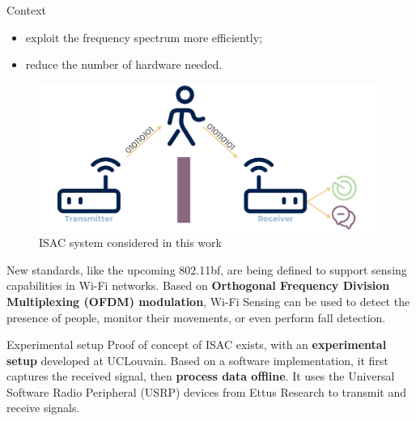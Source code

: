 \documentclass[final]{beamer}
\newlength{\onecolwid}
\begin{document}
\begin{frame}[t,fragile]
\begin{columns}[t]
\begin{column}{\onecolwid}
\begin{block}{Context}
    \begin{itemize}
      \item \hspace{0.2cm} exploit the frequency spectrum more efficiently;
      \item \hspace{0.2cm} reduce the number of hardware needed.
    \end{itemize}

    \begin{figure}[!ht]
      \centering
      \includegraphics[width=\linewidth]{img/isac.pdf}
      \caption{ISAC system considered in this work}
    \end{figure}

    \vspace{-0.2in}


    New standards, like the upcoming 802.11bf, are being defined to support sensing capabilities in Wi-Fi networks. 
    Based on \textbf{Orthogonal Frequency Division Multiplexing (OFDM) modulation}, Wi-Fi Sensing can be used to detect the presence of people, monitor their movements, or even perform fall detection.
  \end{block}

  \vspace{-0.2in}

  \begin{block}{Experimental setup}
    Proof of concept of ISAC exists, with an \textbf{experimental setup} developed at UCLouvain. 
    Based on a software implementation,  %
    it first captures the received signal, then \textbf{process data offline}. 
    It uses the Universal Software Radio Peripheral (USRP) devices from Ettus Research to transmit and receive signals.


\end{block}
\end{column}
\end{columns}
\end{frame}
\end{document}
